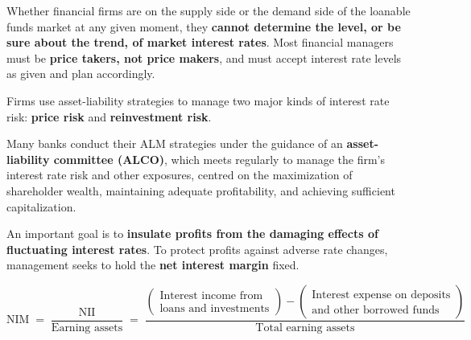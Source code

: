 \begin{lrkeybox}
Whether financial firms are on the supply side or the demand side of the loanable funds market at any given moment, they \textbf{cannot determine the level, or be sure about the trend, of market interest rates}. Most financial managers must be \textbf{price takers, not price makers}, and must accept interest rate levels as given and plan accordingly.

Firms use asset-liability strategies to manage two major kinds of interest rate risk: \textbf{price risk} and \textbf{reinvestment risk}.

Many banks conduct their ALM strategies under the guidance of an \textbf{asset-liability committee (ALCO)}, which meets regularly to manage the firm's interest rate risk and other exposures, centred on the maximization of shareholder wealth, maintaining adequate profitability, and achieving sufficient capitalization.
\end{lrkeybox}


An important goal is to \textbf{insulate profits from the damaging effects of fluctuating interest rates}. To protect profits against adverse rate changes, management seeks to hold the \textbf{net interest margin} fixed.

\begin{lrfmlbox}
\[ \text{NIM} \;=\; \frac{\text{NII}}{\text{Earning assets}} \;=\; \frac{\begin{pmatrix}\text{Interest income from}\\ \text{loans and investments}\end{pmatrix} - \begin{pmatrix}\text{Interest expense on deposits}\\ \text{and other borrowed funds}\end{pmatrix}}{\text{Total earning assets}} \]
\end{lrfmlbox}

